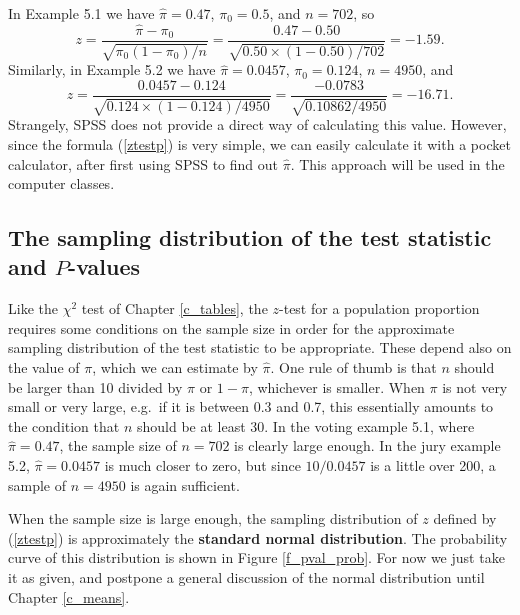 In Example 5.1 we have $\hat{\pi}=0.47$, $\pi_{0}=0.5$, and $n=702$, so
\[
z=\frac{\hat{\pi}-\pi_{0}}{\sqrt{\pi_{0}(1-\pi_{0})/n}}=
\frac{0.47-0.50}{\sqrt{0.50\times(1-0.50)/702}}=-1.59.
\]
Similarly, in Example 5.2 we have $\hat{\pi}=0.0457$, $\pi_{0}=0.124$,
$n=4950$,
and
\[
z=\frac{0.0457-0.124}{\sqrt{0.124\times(1-0.124)/4950}}
=
\frac{-0.0783}{\sqrt{0.10862/4950}}=-16.71.
\]
Strangely, SPSS does not provide a direct way of calculating this value.
However, since the formula (\ref{ztestp}) is very simple, we can easily
calculate it with a pocket calculator, after first using SPSS to find
out $\hat{\pi}$. This approach will be used in the computer classes.

\subsection{The sampling distribution of the test statistic and
$P$-values}
\label{ss-probs-test1sample-samplingd}

\label{p_thumbp}
Like the $\chi^{2}$ test of Chapter \ref{c_tables}, the $z$-test for a
population proportion requires some conditions on the sample size in
order for the approximate sampling distribution of the test statistic to
be appropriate. These depend also on the value of $\pi$, which we can
estimate by $\hat{\pi}$. One rule of thumb is that $n$ should be larger
than 10 divided by $\pi$ or $1-\pi$, whichever is smaller. When $\pi$ is
not very small or very large, e.g.\ if it is between 0.3 and 0.7, this
essentially amounts to the condition that $n$ should be at least 30. In
the voting example 5.1, where $\hat{\pi}=0.47$, the sample size of
$n=702$ is clearly large enough. In the jury example 5.2,
$\hat{\pi}=0.0457$ is much closer to zero, but since $10/0.0457$ is a
little over 200, a sample of $n=4950$ is again sufficient.

When the sample size is large enough, the sampling distribution of $z$
defined by (\ref{ztestp}) is approximately the \textbf{standard normal
distribution}. The probability curve of this distribution is shown in
Figure  \ref{f_pval_prob}. For now we just take it as given, and
postpone a general discussion of the normal distribution
until Chapter \ref{c_means}.


